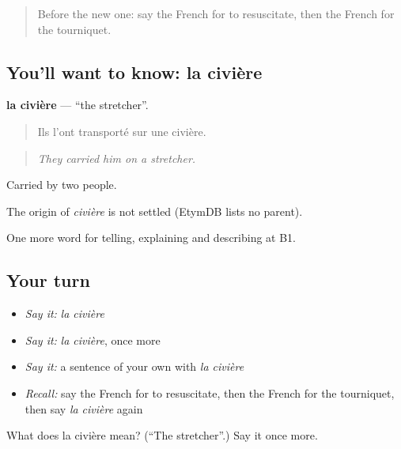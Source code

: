 \label{lesson:FR-C300-civiere}



\begin{quote}
Before the new one: say the French for to resuscitate, then the French for the tourniquet.
\end{quote}

\subsection*{You'll want to know: la civière}
\textbf{la civière} — \textquotedblleft{}the stretcher\textquotedblright{}.

\begin{quote}
Ils l'ont transporté sur une civière.
\end{quote}

\begin{quote}
\emph{They carried him on a stretcher.}
\end{quote}

Carried by two people.

\begin{cousinweb}
The origin of \emph{civière} is not settled (EtymDB lists no parent).
\end{cousinweb}

\begin{grammarlens}[title={What you've built}]
One more word for telling, explaining and describing at B1.
\end{grammarlens}

\subsection*{Your turn}
\begin{itemize}
\raggedright
  \item \emph{Say it:} \emph{la civière}
  \item \emph{Say it:} \emph{la civière}, once more
  \item \emph{Say it:} a sentence of your own with \emph{la civière}
  \item \emph{Recall:} say the French for to resuscitate, then the French for the tourniquet, then say \emph{la civière} again
\end{itemize}

\begin{tcolorbox}[breakable,colback=teal!4,colframe=teal!35!black,title={Before you move on}]
What does la civière mean? (\textquotedblleft{}The stretcher\textquotedblright{}.) Say it once more.
\end{tcolorbox}
